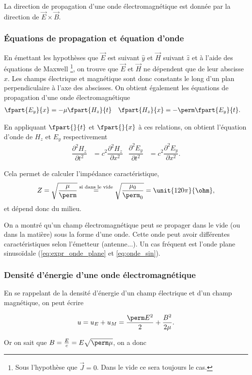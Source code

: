 La direction de propagation d'une onde électromagnétique est
donnée par la direction de $\vec{E} \times \vec{B}$.

\subsubsection{Équations de propagation et équation d'onde}
En émettant les hypothèses que $\vec{E}$ est suivant $\hat{y}$ et $\vec{H}$ suivant $\hat{z}$ et à l'aide des équations de Maxwell
\footnote{Sous l'hypothèse que $\vec{J}=0$. Dans le vide ce sera toujours le cas.}, on trouve que $\vec{E}$ et $\vec{H}$ ne dépendent
que de leur abscisse $x$. Les champs électrique et magnétique sont donc constants le long d'un plan perpendiculaire 
à l'axe des abscisses. On obtient également les équations de propagation d'une onde électromagnétique
\begin{align*}
\fpart{E_y}{x} &= -\mu \fpart{H_z}{t} & \fpart{H_z}{x} &= -\perm \fpart{E_y}{t}.
\end{align*}

En appliquant $\fpart{}{t}$ et $\fpart{}{x}$ à ces relations, on obtient l'équation d'onde de $H_z$ et $E_y$ respectivement
\begin{align*}
\dfrac{\partial^2 H_z}{\partial t^2} &=
c^2 \dfrac{\partial^2 H_z}{\partial x^2}
& \dfrac{\partial^2 E_y}{\partial t^2} &=
c^2 \dfrac{\partial^2 E_y}{\partial x^2}.
\end{align*}

Cela permet de calculer l'impédance caractéristique,
\[
Z = \sqrt{\dfrac{\mu}{\perm}} \overset{\text{si dans le vide}}{=} \sqrt{\dfrac{\mu_0}{\perm_0}} = \unit{120\pi}{\ohm},
\]
et dépend donc du milieu.

On a montré qu'un champ électromagnétique peut se propager dans le vide
(ou dans la matière) sous la forme d'une onde. Cette onde peut avoir différentes
caractéristiques selon l'émetteur (antenne...).
Un cas fréquent est l'onde plane sinusoïdale (\eqref{eq:expr_onde_plane} et
\eqref{eq:onde_sin}).

\subsubsection{Densité d'énergie d'une onde électromagnétique}
En se rappelant de la densité d'énergie d'un champ électrique et
d'un champ magnétique, on peut écrire

$$u = u_E + u_M = \frac{\perm E^2}{2} + \frac{B^2}{2\mu}.$$

Or on sait que $B = \frac{E}{c} = E\sqrt{\perm\mu}$, on a donc

